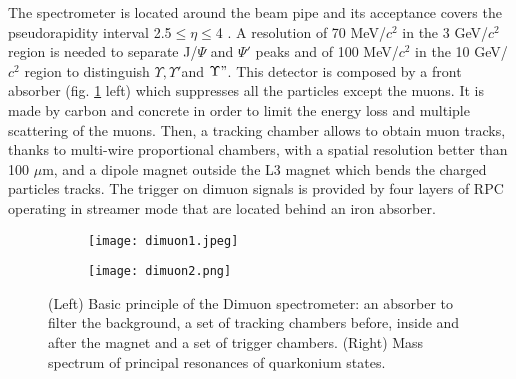 The spectrometer is located around the beam pipe and its acceptance covers the pseudorapidity interval 2.5$\leq \eta \leq$4 \cite{FMS-TDR}. A resolution of 70 MeV/$c^2$ in the 3 GeV/$c^2$ region is needed to separate J/$\Psi$ and $\Psi'$ peaks and of 100 MeV/$c^2$ in the 10 GeV/$c^2$ region to distinguish $\Upsilon, \Upsilon' $and $\Upsilon"$.
This detector is composed by a front absorber (fig. \ref{fig:muon} left) which suppresses all the particles except the muons. It is made by carbon and concrete in order to limit the energy loss and multiple scattering of the muons. Then, a tracking chamber allows to obtain muon tracks, thanks to multi-wire proportional chambers, with a spatial resolution better than 100 $\mu$m, and a dipole magnet outside the L3 magnet which bends the charged particles tracks. The trigger on dimuon signals is provided by four layers of RPC operating in streamer mode that are located behind an iron absorber.
\begin{figure}[!t]
\begin{subfigure}{0.5\textwidth}
\texttt{[image: dimuon1.jpeg]}
\end{subfigure}
\begin{subfigure}{0.5\textwidth}
\centering
\texttt{[image: dimuon2.png]}
\end{subfigure}
\caption{(Left) Basic principle of the Dimuon spectrometer: an absorber to filter the background, a set of tracking chambers before, inside and after the magnet and a set of trigger chambers. (Right) Mass spectrum of principal resonances of quarkonium states.}
\label{fig:muon}
\end{figure}


